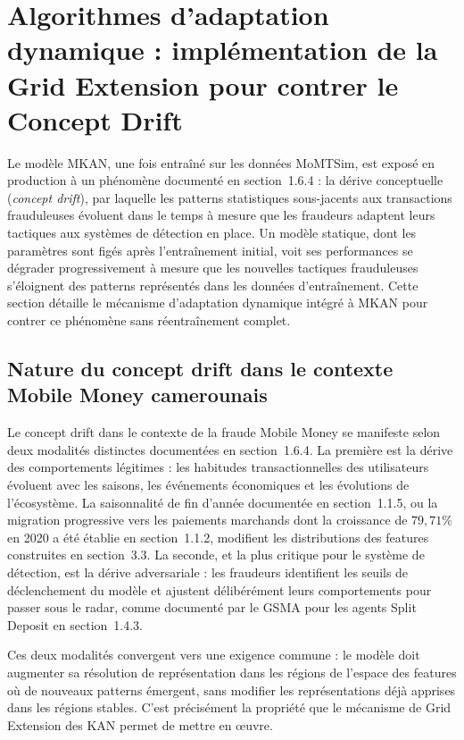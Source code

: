 \documentclass[11pt,a4paper,oneside]{report}
\theoremstyle{definition}
\theoremstyle{remark}
\begin{document}
\section{Algorithmes d'adaptation dynamique : implémentation de la Grid Extension pour contrer le Concept Drift}

Le modèle MKAN, une fois entraîné sur les données MoMTSim, est exposé en production à un phénomène documenté en section~1.6.4 : la dérive conceptuelle (\textit{concept drift}), par laquelle les patterns statistiques sous-jacents aux transactions frauduleuses évoluent dans le temps à mesure que les fraudeurs adaptent leurs tactiques aux systèmes de détection en place. Un modèle statique, dont les paramètres sont figés après l'entraînement initial, voit ses performances se dégrader progressivement à mesure que les nouvelles tactiques frauduleuses s'éloignent des patterns représentés dans les données d'entraînement. Cette section détaille le mécanisme d'adaptation dynamique intégré à MKAN pour contrer ce phénomène sans réentraînement complet.

\subsection{Nature du concept drift dans le contexte Mobile Money camerounais}

Le concept drift dans le contexte de la fraude Mobile Money se manifeste selon deux modalités distinctes documentées en section~1.6.4. La première est la dérive des comportements légitimes : les habitudes transactionnelles des utilisateurs évoluent avec les saisons, les événements économiques et les évolutions de l'écosystème. La saisonnalité de fin d'année documentée en section~1.1.5, ou la migration progressive vers les paiements marchands dont la croissance de $79{,}71\%$ en 2020 a été établie en section~1.1.2, modifient les distributions des features construites en section~3.3. La seconde, et la plus critique pour le système de détection, est la dérive adversariale : les fraudeurs identifient les seuils de déclenchement du modèle et ajustent délibérément leurs comportements pour passer sous le radar, comme documenté par le GSMA pour les agents Split Deposit en section~1.4.3.

Ces deux modalités convergent vers une exigence commune : le modèle doit augmenter sa résolution de représentation dans les régions de l'espace des features où de nouveaux patterns émergent, sans modifier les représentations déjà apprises dans les régions stables. C'est précisément la propriété que le mécanisme de Grid Extension des KAN permet de mettre en œuvre.
\end{document}
